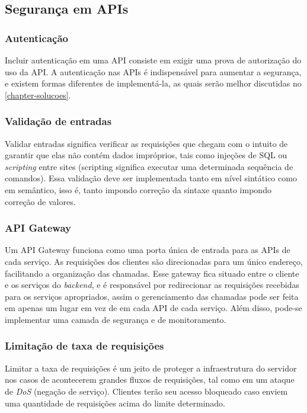 \subsection{Segurança em APIs}

\subsubsection*{Autenticação}

Incluir autenticação em uma API consiste em exigir uma prova de autorização do uso da API. A autenticação nas APIs é indispensável para aumentar a segurança, e existem formas diferentes de implementá-la, as quais serão melhor discutidas no \autoref{chapter-solucoes}.

\subsubsection*{Validação de entradas}

Validar entradas significa verificar as requisições que chegam com o intuito de garantir que elas não contém dados impróprios, tais como injeções de SQL ou \emph{scripting} entre sites (scripting significa executar uma determinada sequência de comandos). Essa validação deve ser implementada tanto em nível sintático como em semântico, isso é, tanto impondo correção da sintaxe quanto impondo correção de valores. \cite{rapidAPI-security}

\subsubsection*{API Gateway}

Um API Gateway funciona como uma porta única de entrada para as APIs de cada serviço. As requisições dos clientes são direcionadas para um único endereço, facilitando a organização das chamadas. Esse gateway fica situado entre o cliente e os serviços do \emph{backend}, e é responsável por redirecionar as requisições recebidas para os serviços apropriados, assim o gerenciamento das chamadas pode ser feita em apenas um lugar em vez de em cada API de cada serviço. Além disso, pode-se implementar uma camada de segurança e de monitoramento. \cite{rapidAPI-security}

\subsubsection*{Limitação de taxa de requisições}

Limitar a taxa de requisições é um jeito de proteger a infraestrutura do servidor nos casos de acontecerem grandes fluxos de requisições, tal como em um ataque de \emph{DoS} (negação de serviço). Clientes terão seu acesso bloqueado caso enviem uma quantidade de requisições acima do limite determinado. \cite{rapidAPI-security}

